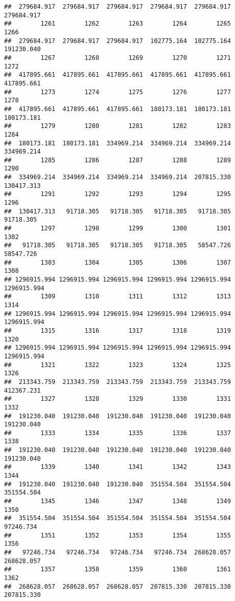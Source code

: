 \documentclass[
]{book}
\begin{document}
\begin{verbatim}
##  279684.917  279684.917  279684.917  279684.917  279684.917  279684.917 
##        1261        1262        1263        1264        1265        1266 
##  279684.917  279684.917  279684.917  102775.164  102775.164  191230.040 
##        1267        1268        1269        1270        1271        1272 
##  417895.661  417895.661  417895.661  417895.661  417895.661  417895.661 
##        1273        1274        1275        1276        1277        1278 
##  417895.661  417895.661  417895.661  180173.181  180173.181  180173.181 
##        1279        1280        1281        1282        1283        1284 
##  180173.181  180173.181  334969.214  334969.214  334969.214  334969.214 
##        1285        1286        1287        1288        1289        1290 
##  334969.214  334969.214  334969.214  334969.214  207815.330  130417.313 
##        1291        1292        1293        1294        1295        1296 
##  130417.313   91718.305   91718.305   91718.305   91718.305   91718.305 
##        1297        1298        1299        1300        1301        1302 
##   91718.305   91718.305   91718.305   91718.305   58547.726   58547.726 
##        1303        1304        1305        1306        1307        1308 
## 1296915.994 1296915.994 1296915.994 1296915.994 1296915.994 1296915.994 
##        1309        1310        1311        1312        1313        1314 
## 1296915.994 1296915.994 1296915.994 1296915.994 1296915.994 1296915.994 
##        1315        1316        1317        1318        1319        1320 
## 1296915.994 1296915.994 1296915.994 1296915.994 1296915.994 1296915.994 
##        1321        1322        1323        1324        1325        1326 
##  213343.759  213343.759  213343.759  213343.759  213343.759  412367.231 
##        1327        1328        1329        1330        1331        1332 
##  191230.040  191230.040  191230.040  191230.040  191230.040  191230.040 
##        1333        1334        1335        1336        1337        1338 
##  191230.040  191230.040  191230.040  191230.040  191230.040  191230.040 
##        1339        1340        1341        1342        1343        1344 
##  191230.040  191230.040  191230.040  351554.504  351554.504  351554.504 
##        1345        1346        1347        1348        1349        1350 
##  351554.504  351554.504  351554.504  351554.504  351554.504   97246.734 
##        1351        1352        1353        1354        1355        1356 
##   97246.734   97246.734   97246.734   97246.734  268628.057  268628.057 
##        1357        1358        1359        1360        1361        1362 
##  268628.057  268628.057  268628.057  207815.330  207815.330  207815.330 

\end{verbatim}
\end{document}
